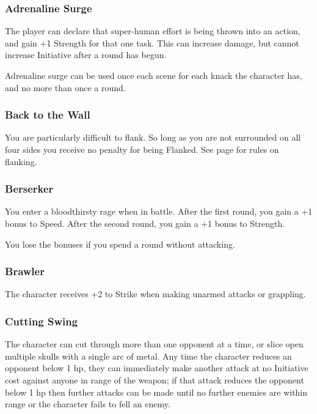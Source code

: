 \begin{multicols}{2}

\subsubsection{Adrenaline Surge}
\label{adrenalinesurge}

The player can declare that super-human effort is being thrown into an action, and gain +1 Strength for that one task.  This can increase damage, but cannot increase Initiative after a \gls{round} has begun.

Adrenaline surge can be used once each scene for each knack the character has, and no more than once a \gls{round}.

\subsubsection{Back to the Wall}

You are particularly difficult to flank. So long as you are not surrounded on all four sides you receive no penalty for being Flanked.
See page \pageref{flank} for rules on flanking.

\subsubsection{Berserker}

You enter a bloodthirsty rage when in battle.
After the first round, you gain a +1 bonus to Speed.
After the second round, you gain a +1 bonus to Strength.

You lose the bonuses if you spend a round without attacking.

\subsubsection{Brawler}

The character receives +2 to Strike when making unarmed attacks or grappling.

\subsubsection{Cutting Swing}

The character can cut through more than one opponent at a time, or slice open multiple skulls with a single arc of metal.
Any time the character reduces an opponent below 1 \gls{hp}, they can immediately make another attack at no Initiative cost against anyone in range of the weapon; if that attack reduces the opponent below 1 \gls{hp} then further attacks can be made until no further enemies are within range or the character fails to fell an enemy.


\end{multicols}
